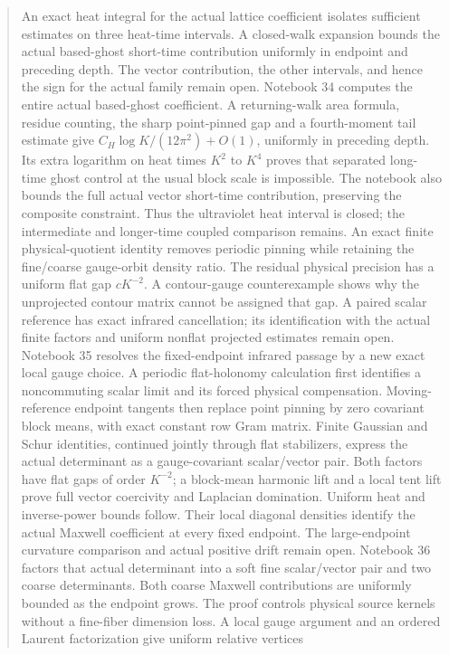 \documentclass[11pt]{article}
\theoremstyle{remark}
\begin{document}
\begin{abstract}
An exact heat integral for the actual lattice coefficient isolates
sufficient estimates on three heat-time intervals. A closed-walk
expansion bounds the actual based-ghost short-time contribution
uniformly in endpoint and preceding depth. The vector contribution,
the other intervals, and hence the sign for the actual family
remain open.
Notebook 34 computes the entire actual based-ghost coefficient.
A returning-walk area formula, residue counting, the sharp
point-pinned gap and a fourth-moment tail estimate give
\(C_H\log K/(12\pi^2)+O(1)\), uniformly in preceding depth.
Its extra logarithm on heat times \(K^2\) to \(K^4\) proves
that separated long-time ghost control at the usual block
scale is impossible. The notebook also bounds the full
actual vector short-time contribution, preserving the
composite constraint. Thus the ultraviolet heat interval
is closed; the intermediate and longer-time coupled
comparison remains.
An exact finite physical-quotient identity removes
periodic pinning while retaining the fine/coarse gauge-orbit
density ratio. The residual physical precision has a uniform
flat gap \(cK^{-2}\). A contour-gauge counterexample shows
why the unprojected contour matrix cannot be assigned that
gap. A paired scalar reference has exact infrared cancellation;
its identification with the actual finite factors and
uniform nonflat projected estimates remain open.
Notebook 35 resolves the fixed-endpoint infrared passage by a
new exact local gauge choice. A periodic flat-holonomy calculation
first identifies a noncommuting scalar limit and its forced
physical compensation. Moving-reference endpoint tangents then
replace point pinning by zero covariant block means, with exact
constant row Gram matrix. Finite Gaussian and Schur identities,
continued jointly through flat stabilizers, express the actual
determinant as a gauge-covariant scalar/vector pair. Both factors
have flat gaps of order \(K^{-2}\); a block-mean harmonic lift
and a local tent lift prove full vector coercivity and Laplacian
domination. Uniform heat and inverse-power bounds follow.
Their local diagonal densities identify the actual Maxwell
coefficient at every fixed endpoint. The large-endpoint
curvature comparison and actual positive drift remain open.
Notebook 36 factors that actual determinant into a soft fine
scalar/vector pair and two coarse determinants. Both coarse
Maxwell contributions are uniformly bounded as the endpoint
grows. The proof controls physical source kernels without a
fine-fiber dimension loss. A local gauge argument and an
ordered Laurent factorization give uniform relative vertices

\end{abstract}
\end{document}
